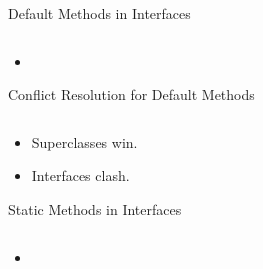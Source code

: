 \documentclass{beamer}
\begin{document}
\begin{frame}[fragile]{Default Methods in Interfaces}


\begin{lstlisting}[language=Java]

\end{lstlisting}

\begin{itemize}
\item
\end{itemize}


\end{frame}

\begin{frame}[fragile]{Conflict Resolution for Default Methods}


\begin{lstlisting}[language=Java]

\end{lstlisting}

\begin{itemize}
\item Superclasses win.
\item Interfaces clash.
\end{itemize}


\end{frame}

\begin{frame}[fragile]{Static Methods in Interfaces}


\begin{lstlisting}[language=Java]

\end{lstlisting}

\begin{itemize}
\item
\end{itemize}


\end{frame}









\end{document}
